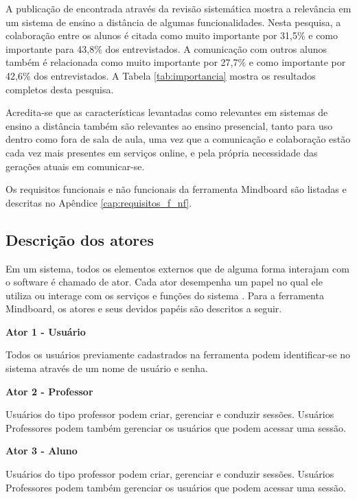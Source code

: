 
A publicação de   encontrada através da revisão sistemática mostra a relevância em um sistema de ensino a distância de algumas funcionalidades. Nesta pesquisa, a colaboração entre os alunos é citada como muito importante por 31,5\% e como importante para 43,8\% dos entrevistados. A comunicação com outros alunos também é relacionada como muito importante por 27,7\% e como importante por 42,6\% dos entrevistados. A Tabela \ref{tab:importancia} mostra os resultados completos desta pesquisa. 

Acredita-se que as características levantadas como relevantes em sistemas de ensino a distância também são relevantes ao ensino presencial, tanto para uso dentro como fora de sala de aula, uma vez que a comunicação e colaboração estão cada vez mais presentes em serviços online, e pela própria necessidade das gerações atuais em comunicar-se.

Os requisitos funcionais e não funcionais da ferramenta Mindboard são listadas e descritas no Apêndice \ref{cap:requisitos_f_nf}.


\subsection{Descrição dos atores}

Em um sistema, todos os elementos externos que de alguma forma interajam com o software é chamado de ator. Cada ator desempenha um papel no qual ele utiliza ou interage com os serviços e funções do sistema \cite{guedes:2009}. Para a ferramenta Mindboard, os atores e seus devidos papéis são descritos a seguir.


\textbf{Ator 1 - Usuário}

Todos os usuários previamente cadastrados na ferramenta podem identificar-se no sistema através de um nome de usuário e senha.

\textbf{Ator 2 - Professor}

Usuários do tipo professor podem criar, gerenciar e conduzir sessões. Usuários Professores podem também gerenciar os usuários que podem acessar uma sessão.

\textbf{Ator 3 - Aluno}

Usuários do tipo professor podem criar, gerenciar e conduzir sessões. Usuários Professores podem também gerenciar os usuários que podem acessar uma sessão.

